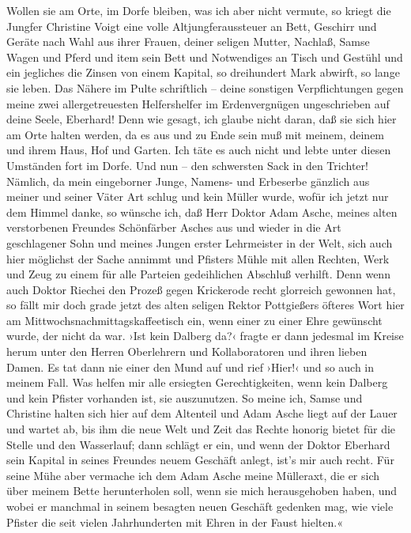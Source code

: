 Wollen sie am Orte, im Dorfe bleiben, was ich aber nicht vermute,
so kriegt die Jungfer Christine Voigt eine volle
Altjungferaussteuer an Bett, Geschirr und Geräte nach Wahl aus
ihrer Frauen, deiner seligen Mutter, Nachlaß, Samse Wagen und Pferd
und item sein Bett und Notwendiges an Tisch und Gestühl und ein
jegliches die Zinsen von einem Kapital, so dreihundert Mark
abwirft, so lange sie leben. Das Nähere im Pulte schriftlich –
deine sonstigen Verpflichtungen gegen meine zwei allergetreuesten
Helfershelfer im Erdenvergnügen ungeschrieben auf deine Seele,
Eberhard! Denn wie gesagt, ich glaube nicht daran, daß sie sich
hier am Orte halten werden, da es aus und zu Ende sein muß mit
meinem, deinem und ihrem Haus, Hof und Garten. Ich täte es auch
nicht und lebte unter diesen Umständen fort im Dorfe. Und nun – den
schwersten Sack in den Trichter! Nämlich, da mein eingeborner
Junge, Namens- und Erbeserbe gänzlich aus meiner und seiner Väter
Art schlug und kein Müller wurde, wofür ich jetzt nur dem Himmel
danke, so wünsche ich, daß Herr Doktor Adam Asche, meines alten
verstorbenen Freundes Schönfärber Asches aus und wieder in die Art
geschlagener Sohn und meines Jungen erster Lehrmeister in der Welt,
sich auch hier möglichst der Sache annimmt und Pfisters Mühle mit
allen Rechten, Werk und Zeug zu einem für alle Parteien
gedeihlichen Abschluß verhilft. Denn wenn auch Doktor Riechei den
Prozeß gegen Krickerode recht glorreich gewonnen hat, so fällt mir
doch grade jetzt des alten seligen Rektor Pottgießers öfteres Wort
hier am Mittwochsnachmittagskaffeetisch ein, wenn einer zu einer
Ehre gewünscht wurde, der nicht da war. ›Ist kein Dalberg da?‹
fragte er dann jedesmal im Kreise herum unter den Herren
Oberlehrern und Kollaboratoren und ihren lieben Damen. Es tat dann
nie einer den Mund auf und rief ›Hier!‹ und so auch in meinem Fall.
Was helfen mir alle ersiegten Gerechtigkeiten, wenn kein Dalberg
und kein Pfister vorhanden ist, sie auszunutzen. So meine ich,
Samse und Christine halten sich hier auf dem Altenteil und Adam
Asche liegt auf der Lauer und wartet ab, bis ihm die neue Welt und
Zeit das Rechte honorig bietet für die Stelle und den Wasserlauf;
dann schlägt er ein, und wenn der Doktor Eberhard sein Kapital in
seines Freundes neuem Geschäft anlegt, ist's mir auch recht. Für
seine Mühe aber vermache ich dem Adam Asche meine Mülleraxt, die er
sich über meinem Bette herunterholen soll, wenn sie mich
herausgehoben haben, und wobei er manchmal in seinem besagten neuen
Geschäft gedenken mag, wie viele Pfister die seit vielen
Jahrhunderten mit Ehren in der Faust hielten.«

